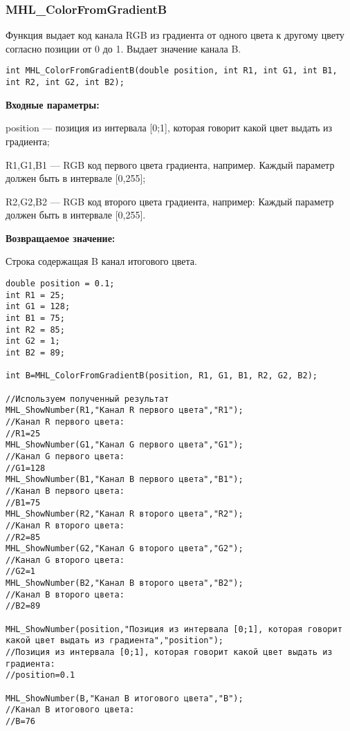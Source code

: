 \documentclass[a4paper,12pt]{article}
\begin{document}
\subsubsection{MHL\_ColorFromGradientB}\label{MHL_ColorFromGradientB}

Функция выдает код канала RGB из градиента от одного цвета к другому цвету согласно позиции от 0 до 1. Выдает значение канала B.


\begin{lstlisting}[label=code_syntax_MHL_ColorFromGradientB,caption=Синтаксис]
int MHL_ColorFromGradientB(double position, int R1, int G1, int B1, int R2, int G2, int B2);
\end{lstlisting}

\textbf{Входные параметры:}  

position --- позиция из интервала [0;1], которая говорит какой цвет выдать из градиента;
 
    R1,G1,B1 --- RGB код первого цвета градиента, например. Каждый параметр должен быть в интервале [0,255];
 
    R2,G2,B2 --- RGB код второго цвета градиента, например: Каждый параметр должен быть в интервале [0,255].

\textbf{Возвращаемое значение:}

Строка содержащая B канал итогового цвета.


\begin{lstlisting}[label=code_use_MHL_ColorFromGradientB,caption=Пример использования]
double position = 0.1;
int R1 = 25;
int G1 = 128;
int B1 = 75;
int R2 = 85;
int G2 = 1;
int B2 = 89;

int B=MHL_ColorFromGradientB(position, R1, G1, B1, R2, G2, B2);

//Используем полученный результат
MHL_ShowNumber(R1,"Канал R первого цвета","R1");
//Канал R первого цвета:
//R1=25
MHL_ShowNumber(G1,"Канал G первого цвета","G1");
//Канал G первого цвета:
//G1=128
MHL_ShowNumber(B1,"Канал B первого цвета","B1");
//Канал B первого цвета:
//B1=75
MHL_ShowNumber(R2,"Канал R второго цвета","R2");
//Канал R второго цвета:
//R2=85
MHL_ShowNumber(G2,"Канал G второго цвета","G2");
//Канал G второго цвета:
//G2=1
MHL_ShowNumber(B2,"Канал B второго цвета","B2");
//Канал B второго цвета:
//B2=89

MHL_ShowNumber(position,"Позиция из интервала [0;1], которая говорит какой цвет выдать из градиента","position");
//Позиция из интервала [0;1], которая говорит какой цвет выдать из градиента:
//position=0.1

MHL_ShowNumber(B,"Канал B итогового цвета","B");
//Канал B итогового цвета:
//B=76
\end{lstlisting}
\end{document}
